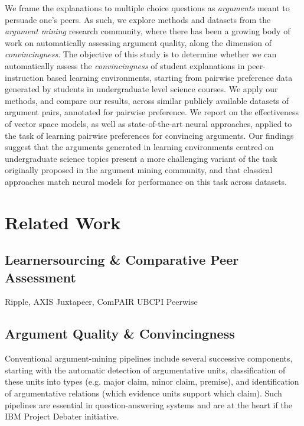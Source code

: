 \documentclass[runningheads]{llncs}
\begin{document}
We frame the explanations to multiple choice questions as \textit{arguments} 
meant to persuade one's peers. As such, we explore methods and datasets from 
the \textit{argument mining} research community, where there has been a growing 
body of work on automatically assessing argument quality, along the dimension 
of \textit{convincingness}.
The objective of this study is to determine whether we can automatically assess 
the \textit{convincingness} of student explanations in peer-instruction based 
learning environments, starting from pairwise preference data generated by 
students in undergraduate level science courses. We apply our methods, and 
compare our results, across similar publicly available datasets of argument 
pairs, annotated for pairwise preference. We report on the effectiveness of 
vector space models, as well as state-of-the-art neural approaches, applied to 
the task of learning pairwise preferences for convincing arguments. Our 
findings suggest that the arguments generated in learning environments centred 
on undergraduate science topics present a more challenging variant of the task 
originally proposed in the argument mining community, and that classical 
approaches match neural models for performance on this task across datasets.

\section{Related Work}
\subsection{Learnersourcing \& Comparative Peer Assessment}
Ripple\cite{khosravi_ripple_2019}, 
AXIS\cite{williams_axis:_2016}
Juxtapeer\cite{cambre_juxtapeer:_2018}, 
ComPAIR\cite{potter_compair:_2017}
UBCPI\cite{univeristy_of_british_columbia_ubc/ubcpi_2019}
Peerwise\cite{denny_peerwise:_2008}
\subsection{Argument Quality \& Convincingness}
Conventional argument-mining pipelines include several successive components, 
starting with the automatic detection of argumentative units, classification of 
these units into types (e.g. major claim, minor claim, premise), and 
identification of argumentative relations (which evidence units support which 
claim). Such pipelines are essential in question-answering systems 
\cite{lippi_argumentation_2016} and are at the heart if the IBM Project Debater 
initiative. 
\end{document}
